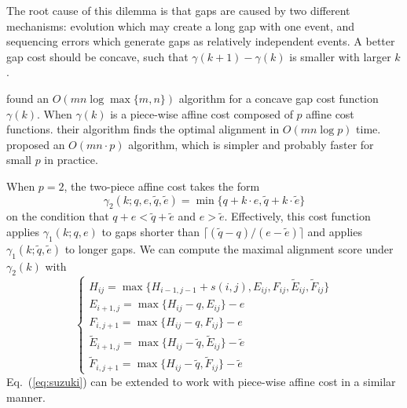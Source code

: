 \documentclass{bioinfo}
\begin{document}
\begin{methods}
The root cause of this dilemma is that gaps are caused by two different
mechanisms: evolution which may create a long gap with one event, and
sequencing errors which generate gaps as relatively independent events. A
better gap cost should be concave, such that $\gamma(k+1)-\gamma(k)$ is smaller
with larger $k$.

\citet{Miller:1988aa} found an $O(mn\log\max\{m,n\})$ algorithm for a concave
gap cost function $\gamma(k)$. When $\gamma(k)$ is a piece-wise affine cost
composed of $p$ affine cost functions. their algorithm finds the optimal
alignment in $O(mn\log p)$ time. \citet{Gotoh:1990aa} proposed an $O(mn\cdot
p)$ algorithm, which is simpler and probably faster for small $p$ in practice.

When $p=2$, the two-piece affine cost takes the form
\[
\gamma_2(k;q,e,\tilde{q},\tilde{e})=\min\{q+k\cdot e,\tilde{q}+k\cdot\tilde{e}\}
\]
on the condition that $q+e<\tilde{q}+\tilde{e}$ and $e>\tilde{e}$. Effectively,
this cost function applies $\gamma_1(k;q,e)$ to gaps shorter than
$\lceil(\tilde{q}-q)/(e-\tilde{e})\rceil$ and applies
$\gamma_1(k;\tilde{q},\tilde{e})$ to longer gaps. We can compute the maximal
alignment score under $\gamma_2(k)$ with
\begin{equation}\label{eq:affine2}
\left\{\begin{array}{l}
H_{ij} = \max\{H_{i-1,j-1}+s(i,j),E_{ij},F_{ij},\tilde{E}_{ij},\tilde{F}_{ij}\}\\
E_{i+1,j}= \max\{H_{ij}-q,E_{ij}\}-e\\
F_{i,j+1}= \max\{H_{ij}-q,F_{ij}\}-e\\
\tilde{E}_{i+1,j}= \max\{H_{ij}-\tilde{q},\tilde{E}_{ij}\}-\tilde{e}\\
\tilde{F}_{i,j+1}= \max\{H_{ij}-\tilde{q},\tilde{F}_{ij}\}-\tilde{e}
\end{array}\right.
\end{equation}
Eq.~(\ref{eq:suzuki}) can be extended to work with piece-wise affine cost in a
similar manner.

\end{methods}


\end{document}
